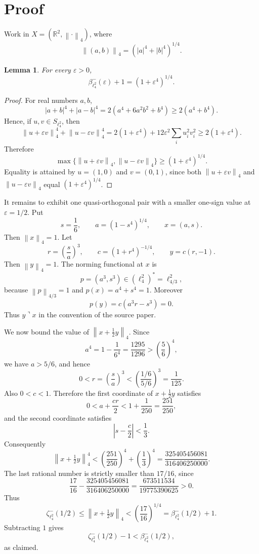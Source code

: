 \documentclass[11pt]{article}
\newtheorem{lemma}{Lemma}
\newcommand{\eps}{\varepsilon}
\newcommand{\norm}[1]{\left\lVert #1 \right\rVert}
\newcommand{\R}{\mathbb{R}}
\begin{document}
\section*{Proof}

Work in \(X=(\R^2,\norm{\cdot}_4)\), where
\[
\norm{(a,b)}_4=(|a|^4+|b|^4)^{1/4}.
\]

\begin{lemma}
For every \(\eps>0\),
\[
\beta^-_{\ell_4^2}(\eps)+1=(1+\eps^4)^{1/4}.
\]
\end{lemma}

\begin{proof}
For real numbers \(a,b\),
\[
|a+b|^4+|a-b|^4=2(a^4+6a^2b^2+b^4)\geq 2(a^4+b^4).
\]
Hence, if \(u,v\in S_{\ell_4^2}\), then
\[
\norm{u+\eps v}_4^4+\norm{u-\eps v}_4^4
=2(1+\eps^4)+12\eps^2\sum_i u_i^2v_i^2
\geq 2(1+\eps^4).
\]
Therefore
\[
\max\{\norm{u+\eps v}_4,\norm{u-\eps v}_4\}\geq (1+\eps^4)^{1/4}.
\]
Equality is attained by \(u=(1,0)\) and \(v=(0,1)\), since both
\(\norm{u+\eps v}_4\) and \(\norm{u-\eps v}_4\) equal
\((1+\eps^4)^{1/4}\).
\end{proof}

It remains to exhibit one quasi-orthogonal pair with a smaller one-sign value
at \(\eps=1/2\).  Put
\[
s=\frac16,\qquad a=(1-s^4)^{1/4},\qquad x=(a,s).
\]
Then \(\norm{x}_4=1\).  Let
\[
r=\left(\frac{s}{a}\right)^3,\qquad c=(1+r^4)^{-1/4},\qquad y=c(r,-1).
\]
Then \(\norm{y}_4=1\).  The norming functional at \(x\) is
\[
p=(a^3,s^3)\in (\ell_4^2)^*=\ell_{4/3}^2,
\]
because \(\norm{p}_{4/3}=1\) and \(p(x)=a^4+s^4=1\).  Moreover
\[
p(y)=c(a^3r-s^3)=0.
\]
Thus \(y\urcorner x\) in the convention of the source paper.

We now bound the value of \(\norm{x+\frac12 y}_4\).  Since
\[
a^4=1-\frac1{6^4}=\frac{1295}{1296}>\left(\frac56\right)^4,
\]
we have \(a>5/6\), and hence
\[
0<r=\left(\frac{s}{a}\right)^3<\left(\frac{1/6}{5/6}\right)^3=\frac1{125}.
\]
Also \(0<c<1\).  Therefore the first coordinate of
\(x+\frac12 y\) satisfies
\[
0<a+\frac{cr}{2}<1+\frac1{250}=\frac{251}{250},
\]
and the second coordinate satisfies
\[
\left|s-\frac{c}{2}\right|<\frac13.
\]
Consequently
\[
\norm{x+\tfrac12 y}_4^4
<\left(\frac{251}{250}\right)^4+\left(\frac13\right)^4
=\frac{325405456081}{316406250000}.
\]
The last rational number is strictly smaller than \(17/16\), since
\[
\frac{17}{16}-\frac{325405456081}{316406250000}
=\frac{673511534}{19775390625}>0.
\]
Thus
\[
\zeta^-_{\ell_4^2}(1/2)
\leq \norm{x+\tfrac12 y}_4
< \left(\frac{17}{16}\right)^{1/4}
=\beta^-_{\ell_4^2}(1/2)+1.
\]
Subtracting \(1\) gives
\[
\zeta^-_{\ell_4^2}(1/2)-1<\beta^-_{\ell_4^2}(1/2),
\]
as claimed.
\end{document}
